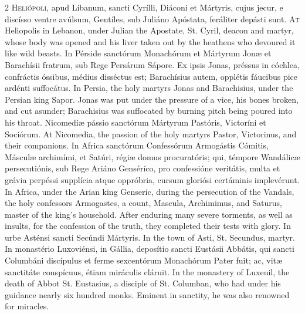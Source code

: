 \begin{paracol}{2}
\lettrine[lines=2]{H}{eliópoli,} apud Líbanum, 
 sancti Cyrílli, Diáconi et Mártyris, cujus jecur, e discísso ventre avúlsum, 
 Gentíles, sub Juliáno Apóstata, feráliter depásti sunt.
\switchcolumn
{}
\lettrine[lines=2]{A}{t} Heliopolis in Lebanon, under Julian the Apostate, St. Cyril, deacon and 
 martyr, whose body was opened and his liver taken out by the heathens who 
 devoured it like wild beasts.
\switchcolumn*
{}
In Pérside sanctórum Monachórum et Mártyrum Jonæ 
 et Barachísii fratrum, sub Rege Persárum Sápore. Ex ipsis Jonas, 
 préssus in cóchlea, confráctis óssibus, médius disséctus est; Barachísius 
 autem, opplétis fáucibus pice ardénti suffocátus.
\switchcolumn
{}
In Persia, the holy martyrs Jonas and Barachisius, under the Persian king 
 Sapor. Jonas was put under the pressure of a vice, his bones broken, 
 and cut asunder; Barachisius was suffocated by burning pitch being poured 
 into his throat.
\switchcolumn*
{}
Nicomedíæ pássio sanctórum Mártyrum Pastóris, 
 Victoríni et Sociórum.
\switchcolumn
{}
At Nicomedia, the passion of the holy martyrs Pastor, Victorinus, and their 
 companions.
\switchcolumn*
{}
In Africa sanctórum Confessórum Armogástis Cómitis, 
 Másculæ archimími, et Satúri, régiæ domus procuratóris; qui, témpore 
 Wandálicæ persecutiónis, sub Rege Ariáno Genséríco, pro confessióne 
 veritátis, multa et grávia perpéssi supplícia atque oppróbria, cursum 
 gloriósi certáminis implevérunt.
\switchcolumn
{}
In Africa, under the Arian king Genseric, during the persecution of the 
 Vandals, the holy confessors Armogastes, a count, Mascula, Archimimus, and 
 Saturus, master of the king's household. After enduring many severe 
 torments, as well as insults, for the confession of the truth, they 
 completed their tests with glory.
\switchcolumn*
{}
In urbe Asténsi sancti Secúndi Mártyris.
\switchcolumn
{}
In the town of Asti, St. Secundus, martyr.
\switchcolumn*
{}
In monastério Luxoviénsi, in Gállia, deposítio sancti Eustásii Abbátis, qui 
 sancti Columbáni discípulus et ferme sexcentórum Monachórum Pater fuit; ac, 
 vitæ sanctitáte conspícuus, étiam miráculis 
 cláruit.
\switchcolumn
{}
In the monastery of Luxeuil, the death of Abbot St. Eustasius, a disciple of 
 St. Columban, who had under his guidance nearly six hundred monks. 
 Eminent in sanctity, he was also renowned for miracles.
\switchcolumn*
{}
\end{paracol}


